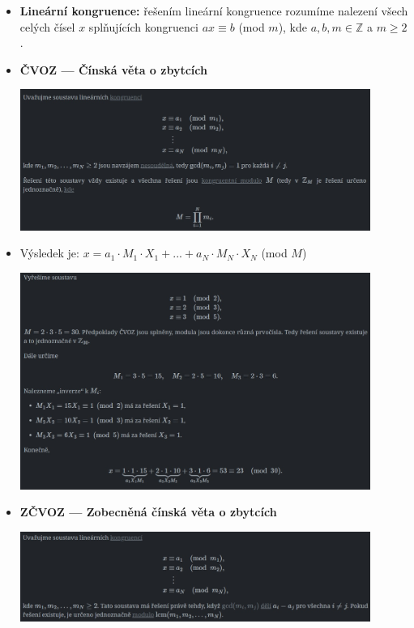 \begin{itemize}
	\item \textbf{Lineární kongruence:} řešením lineární kongruence rozumíme nalezení všech celých čísel $x$ splňujících kongruenci $ax \equiv b$ (mod $m$), kde $a, b, m \in \mathbb{Z}$ a $m \geq 2$.
	
	\item \textbf{ČVOZ --- Čínská věta o zbytcích}
	
	\includegraphics[width=0.9\textwidth]{img/SP-8_2.jpg}
	
	\item Výsledek je: $x = a_1 \cdot M_1 \cdot X_1 + ... + a_N \cdot M_N \cdot X_N$ (mod $M$)
	
	\includegraphics[width=0.9\textwidth]{img/SP-8_3.jpg}
	
	\item \textbf{ZČVOZ --- Zobecněná čínská věta o zbytcích}
	
	\includegraphics[width=0.9\textwidth]{img/SP-8_4.jpg}
\end{itemize}